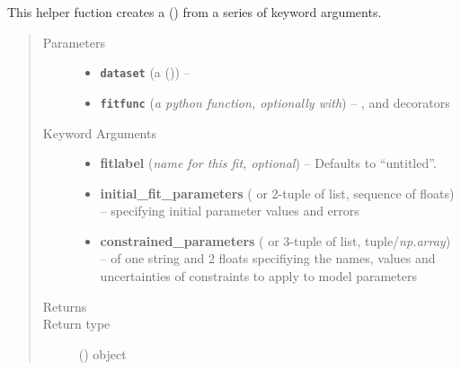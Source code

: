 \documentclass[a4paper,10pt,english]{sphinxmanual}
\begin{document}

\begin{fulllineitems}
\label{index:kafe.fit.build_fit}
This helper fuction creates a {\hyperref[index:kafe.fit.Fit]{\emph{}}} () from a series of
keyword arguments.
\begin{quote}\begin{description}
\item[{Parameters}] \leavevmode\begin{itemize}
\item {} 
\textbf{\texttt{dataset}} (a  {\hyperref[index:kafe.dataset.Dataset]{\emph{}}} ()) -- 

\item {} 
\textbf{\texttt{fitfunc}} (\emph{a python function, optionally with}) -- ,  and  decorators

\end{itemize}

\item[{Keyword Arguments}] \leavevmode\begin{itemize}
\item {} 
\textbf{fitlabel} (\emph{name for this fit, optional}) --
Defaults to ``untitled''.

\item {} 
\textbf{initial\_fit\_parameters} ( or 2-tuple of list, sequence of floats) --
specifying initial parameter values and errors

\item {} 
\textbf{constrained\_parameters} ( or 3-tuple of list, tuple/\emph{np.array}) --
of one string and 2 floats specifiying the names, values and
uncertainties of constraints to apply to model parameters

\end{itemize}

\item[{Returns}] \leavevmode


\item[{Return type}] \leavevmode
{\hyperref[index:kafe.fit.Fit]{\emph{}}} () object

\end{description}\end{quote}

\end{fulllineitems}
\end{document}
